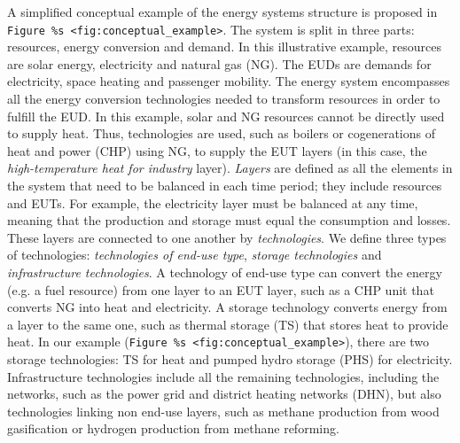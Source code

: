 \documentclass[
]{article}
\begin{document}
A simplified conceptual example of the energy system\textquotesingle s
structure is proposed in
\texttt{Figure\ \%s\ \textless{}fig:conceptual\_example\textgreater{}}.
The system is split in three parts: resources, energy conversion and
demand. In this illustrative example, resources are solar energy,
electricity and natural gas (NG). The EUDs are demands for electricity,
space heating and passenger mobility. The energy system encompasses all
the energy conversion technologies needed to transform resources in
order to fulfill the EUD. In this example, solar and NG resources cannot
be directly used to supply heat. Thus, technologies are used, such as
boilers or cogenerations of heat and power (CHP) using NG, to supply the
EUT layers (in this case, the \emph{high-temperature heat for industry}
layer). \emph{Layers} are defined as all the elements in the system that
need to be balanced in each time period; they include resources and
EUTs. For example, the electricity layer must be balanced at any time,
meaning that the production and storage must equal the consumption and
losses. These layers are connected to one another by
\emph{technologies}. We define three types of technologies:
\emph{technologies of end-use type}, \emph{storage technologies} and
\emph{infrastructure technologies}. A technology of end-use type can
convert the energy (e.g. a fuel resource) from one layer to an EUT
layer, such as a CHP unit that converts NG into heat and electricity. A
storage technology converts energy from a layer to the same one, such as
thermal storage (TS) that stores heat to provide heat. In our example
(\texttt{Figure\ \%s\ \textless{}fig:conceptual\_example\textgreater{}}),
there are two storage technologies: TS for heat and pumped hydro storage
(PHS) for electricity. Infrastructure technologies include all the
remaining technologies, including the networks, such as the power grid
and district heating networks (DHN), but also technologies linking non
end-use layers, such as methane production from wood gasification or
hydrogen production from methane reforming.
\end{document}
